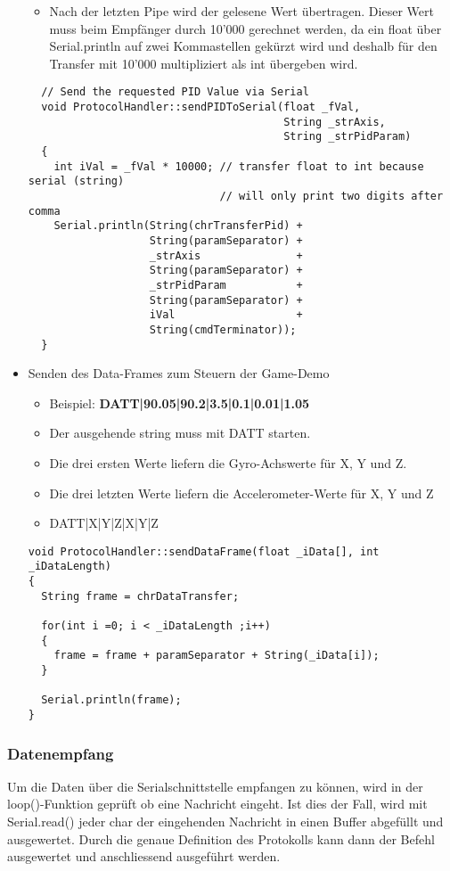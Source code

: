 \begin{itemize}
\begin{itemize}
    \item Nach der letzten Pipe wird der gelesene Wert übertragen. Dieser Wert muss beim Empfänger durch 10'000 gerechnet werden, da ein float über Serial.println auf zwei Kommastellen gekürzt wird und deshalb für den Transfer mit 10'000 multipliziert als int übergeben wird.
  \end{itemize}
  \vspace{3mm}
  \begin{lstlisting}
  // Send the requested PID Value via Serial
  void ProtocolHandler::sendPIDToSerial(float _fVal, 
                                        String _strAxis, 
                                        String _strPidParam)
  {
    int iVal = _fVal * 10000; // transfer float to int because serial (string) 
                              // will only print two digits after comma
    Serial.println(String(chrTransferPid) + 
                   String(paramSeparator) + 
                   _strAxis               + 
                   String(paramSeparator) + 
                   _strPidParam           + 
                   String(paramSeparator) + 
                   iVal                   + 
                   String(cmdTerminator));
  }
  \end{lstlisting}
\newpage
  \item Senden des Data-Frames zum Steuern der Game-Demo
  \begin{itemize}
    \item Beispiel: \textbf{DATT|90.05|90.2|3.5|0.1|0.01|1.05}
    \item Der ausgehende string muss mit DATT starten.
    \item Die drei ersten Werte liefern die Gyro-Achswerte für X, Y und Z.
    \item Die drei letzten Werte liefern die Accelerometer-Werte für X, Y und Z
    \item DATT|X|Y|Z|X|Y|Z
  \end{itemize}
  \vspace{3mm}
  \begin{lstlisting}
void ProtocolHandler::sendDataFrame(float _iData[], int _iDataLength)
{
  String frame = chrDataTransfer;

  for(int i =0; i < _iDataLength ;i++)
  {
    frame = frame + paramSeparator + String(_iData[i]);
  }

  Serial.println(frame);
}
  \end{lstlisting}
\end{itemize} 

\subsubsection{Datenempfang}
Um die Daten über die Serialschnittstelle empfangen zu können, wird in der loop()-Funktion geprüft ob eine Nachricht eingeht. Ist dies der Fall, wird mit Serial.read() jeder char der eingehenden Nachricht in einen Buffer abgefüllt und ausgewertet. Durch die genaue Definition des Protokolls kann dann der Befehl ausgewertet und anschliessend ausgeführt werden.

